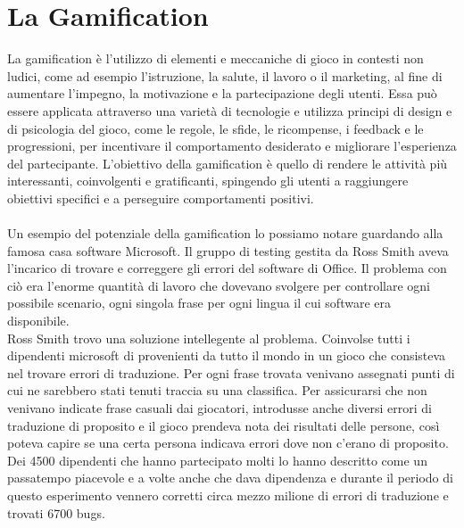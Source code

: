\chapter{La Gamification}
La gamification è l'utilizzo di elementi e meccaniche di gioco in contesti non ludici, come ad esempio l'istruzione, la salute, il lavoro o il marketing, al fine di aumentare l'impegno, la motivazione e la partecipazione degli utenti. Essa può essere applicata attraverso una varietà di tecnologie e utilizza principi di design e di psicologia del gioco, come le regole, le sfide, le ricompense, i feedback e le progressioni, per incentivare il comportamento desiderato e migliorare l'esperienza del partecipante.
L'obiettivo della gamification è quello di rendere le attività più interessanti, coinvolgenti e gratificanti, spingendo gli utenti a raggiungere obiettivi specifici e a perseguire comportamenti positivi.\\
\\
Un esempio del potenziale della gamification lo possiamo notare guardando alla famosa casa software Microsoft. Il gruppo di testing gestita da Ross Smith aveva l'incarico di trovare e correggere gli errori del software di Office. Il problema con ciò era l'enorme quantità di lavoro che dovevano svolgere per controllare ogni possibile scenario, ogni singola frase per ogni lingua il cui software era disponibile.\\
Ross Smith trovo una soluzione intellegente al problema. Coinvolse tutti i dipendenti microsoft di provenienti da tutto il mondo in un gioco che consisteva nel trovare errori di traduzione. Per ogni frase trovata venivano assegnati punti di cui ne sarebbero stati tenuti traccia su una classifica. Per assicurarsi che non venivano indicate frase casuali dai giocatori, introdusse anche diversi errori di traduzione di proposito e il gioco prendeva nota dei risultati delle persone, così poteva capire se una certa persona indicava errori dove non c'erano di proposito.
Dei 4500 dipendenti che hanno partecipato molti lo hanno descritto come un passatempo piacevole e a volte anche che dava dipendenza e durante il periodo di questo esperimento vennero corretti circa mezzo milione di errori di traduzione e trovati 6700 bugs.

